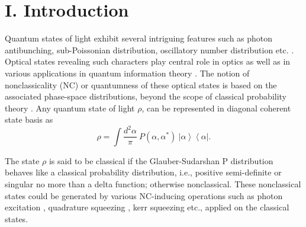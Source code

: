 \documentclass[letter,scriptaddress,twocolumn,prl,showkeys]{revtex4}
\newcommand{\ket}[1]{\left| #1 \right\rangle}
\newcommand{\bra}[1]{\left\langle #1 \right|}
\begin{document}

\maketitle

\section*{I. Introduction}
\label{sec_intro}

Quantum states of light exhibit several intriguing features such as photon antibunching, sub-Poissonian distribution, oscillatory number distribution etc. \cite{book_qo_vogel}. 
Optical states revealing such characters play central role in optics \cite{book_qo_appl_perina} as well as in various applications in quantum information theory \cite{book_qo_appl_kok, book_qo_appl_agarwal}. 
The notion of nonclassicality (NC) or quantumness of these optical states is based on the associated phase-space distributions, beyond the scope of classical probability theory \cite{book_qo_schleich}. 
Any quantum state of light $\rho$, can be represented in diagonal coherent state basis as \cite{pdist_glauber, pdist_sudarshan}
\begin{equation}
\rho = \int\frac{d^{2}\alpha}{\pi}~P(\alpha,\alpha^{*})~\ket\alpha\bra\alpha.
\label{eq_def_rho_pdist}
\end{equation}

The state $\rho$ is said to be classical if the Glauber-Sudarshan P distribution behaves like a classical probability distribution, i.e., positive semi-definite or singular no more than a delta function; otherwise nonclassical. 
These nonclassical states could be generated by various NC-inducing operations such as photon excitation \cite{nc_pa_agarwal}, quadrature squeezing \cite{nc_qs}, kerr squeezing \cite{nc_ampsq_yamamoto} etc., applied on the classical states.
\end{document}
